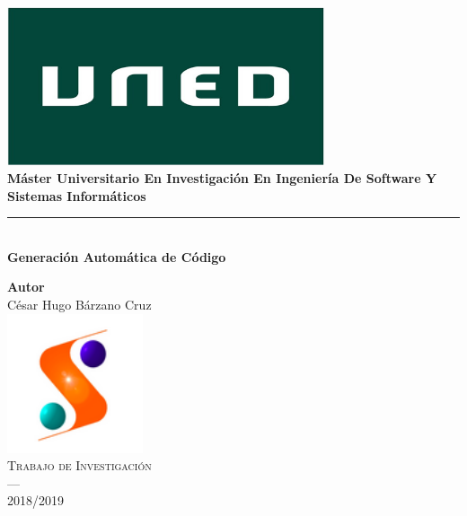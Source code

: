 \begin{titlepage}
 
 
\newlength{\centeroffset}
\setlength{\centeroffset}{-0.5\oddsidemargin}
\addtolength{\centeroffset}{0.5\evensidemargin}
\thispagestyle{empty}

\noindent\hspace*{\centeroffset}\begin{minipage}{\textwidth}

\centering
\includegraphics[width=0.7\textwidth]{imagenes/Logo-uned.jpg}\\[1.1cm]


{\Huge\bfseries Máster Universitario En Investigación En Ingeniería De Software Y Sistemas Informáticos\\
}
\noindent\rule[-1ex]{\textwidth}{3pt}\\[3.5ex]
{\large\bfseries Generación Automática de Código}
\end{minipage}

\vspace{2.5cm}
\noindent\hspace*{\centeroffset}\begin{minipage}{\textwidth}
\centering

\textbf{Autor}\\ {César Hugo Bárzano Cruz}\\[2.5ex]

\includegraphics[width=0.3\textwidth]{imagenes/Logo-master.png}\\[0.1cm]
\textsc{Trabajo de Investigación}\\
\textsc{---}\\
2018/2019
\end{minipage}
\end{titlepage}


